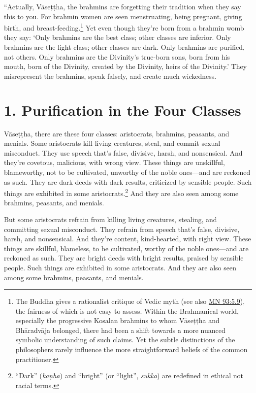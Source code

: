 \documentclass[12pt,openany]{book}%
\begin{document}
“Actually, \textsanskrit{Vāseṭṭha}, the brahmins are forgetting their tradition when they say this to you. For brahmin women are seen menstruating, being pregnant, giving birth, and breast-feeding.\footnote{The Buddha gives a rationalist critique of Vedic myth (see also \href{https://suttacentral.net/mn93/en/sujato\#5.9}{MN 93:5.9}), the fairness of which is not easy to assess. Within the Brahmanical world, especially the progressive Kosalan brahmins to whom \textsanskrit{Vāseṭṭha} and \textsanskrit{Bhāradvāja} belonged, there had been a shift towards a more nuanced symbolic understanding of such claims. Yet the subtle distinctions of the philosophers rarely influence the more straightforward beliefs of the common practitioner. } Yet even though they’re born from a brahmin womb they say: ‘Only brahmins are the best class; other classes are inferior. Only brahmins are the light class; other classes are dark. Only brahmins are purified, not others. Only brahmins are the Divinity’s true-born sons, born from his mouth, born of the Divinity, created by the Divinity, heirs of the Divinity.’ They misrepresent the brahmins, speak falsely, and create much wickedness. 

\section*{1. Purification in the Four Classes }

\textsanskrit{Vāseṭṭha}, there are these four classes: aristocrats, brahmins, peasants, and menials. Some aristocrats kill living creatures, steal, and commit sexual misconduct. They use speech that’s false, divisive, harsh, and nonsensical. And they’re covetous, malicious, with wrong view. These things are unskillful, blameworthy, not to be cultivated, unworthy of the noble ones—and are reckoned as such. They are dark deeds with dark results, criticized by sensible people. Such things are exhibited in some aristocrats.\footnote{“Dark” (\textit{\textsanskrit{kaṇha}}) and “bright” (or “light”, \textit{sukka}) are redefined in ethical not racial terms. } And they are also seen among some brahmins, peasants, and menials. 

But some aristocrats refrain from killing living creatures, stealing, and committing sexual misconduct. They refrain from speech that’s false, divisive, harsh, and nonsensical. And they’re content, kind-hearted, with right view. These things are skillful, blameless, to be cultivated, worthy of the noble ones—and are reckoned as such. They are bright deeds with bright results, praised by sensible people. Such things are exhibited in some aristocrats. And they are also seen among some brahmins, peasants, and menials. 
\end{document}
